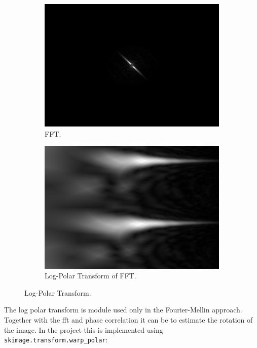 \begin{figure}[H]
    \centering
    \begin{subfigure}[b]{.45\textwidth}
        \centering
        \includegraphics[width=\textwidth]{figures/pipeline/FFT.png}
        \caption{FFT.}
    \end{subfigure}
    \hfill
    \begin{subfigure}[b]{.45\textwidth}
        \centering
        \includegraphics[width=\textwidth]{figures/pipeline/LogPolar.png}
        \caption{Log-Polar Transform of FFT.}
        \label{sfig:log-polar}
    \end{subfigure}
    \caption{Log-Polar Transform.}
    \label{fig:log_polar}
\end{figure}

The log polar transform is module used only in the Fourier-Mellin approach. Together with the \acrshort{fft} and phase correlation it can be to estimate the rotation of the image. In the project this is implemented using \texttt{skimage.transform.warp\_polar}:

